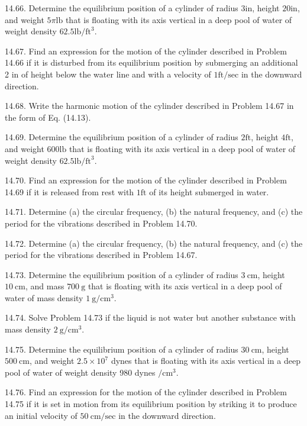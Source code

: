 \documentclass[10pt]{article}
\begin{document}
14.66. Determine the equilibrium position of a cylinder of radius $3 \mathrm{in}$, height $20 \mathrm{in}$, and weight $5 \pi \mathrm{lb}$ that is floating with its axis vertical in a deep pool of water of weight density $62.5 \mathrm{lb} / \mathrm{ft}^{3}$.

14.67. Find an expression for the motion of the cylinder described in Problem 14.66 if it is disturbed from its equilibrium position by submerging an additional 2 in of height below the water line and with a velocity of $1 \mathrm{ft} / \mathrm{sec}$ in the downward direction.

14.68. Write the harmonic motion of the cylinder described in Problem 14.67 in the form of Eq. (14.13).

14.69. Determine the equilibrium position of a cylinder of radius $2 \mathrm{ft}$, height $4 \mathrm{ft}$, and weight $600 \mathrm{lb}$ that is floating with its axis vertical in a deep pool of water of weight density $62.5 \mathrm{lb} / \mathrm{ft}^{3}$.

14.70. Find an expression for the motion of the cylinder described in Problem 14.69 if it is released from rest with $1 \mathrm{ft}$ of its height submerged in water.

14.71. Determine (a) the circular frequency, (b) the natural frequency, and (c) the period for the vibrations described in Problem 14.70.

14.72. Determine (a) the circular frequency, (b) the natural frequency, and (c) the period for the vibrations described in Problem 14.67.

14.73. Determine the equilibrium position of a cylinder of radius $3 \mathrm{~cm}$, height $10 \mathrm{~cm}$, and mass $700 \mathrm{~g}$ that is floating with its axis vertical in a deep pool of water of mass density $1 \mathrm{~g} / \mathrm{cm}^{3}$.

14.74. Solve Problem 14.73 if the liquid is not water but another substance with mass density $2 \mathrm{~g} / \mathrm{cm}^{3}$.

14.75. Determine the equilibrium position of a cylinder of radius $30 \mathrm{~cm}$, height $500 \mathrm{~cm}$, and weight $2.5 \times 10^{7}$ dynes that is floating with its axis vertical in a deep pool of water of weight density 980 dynes $/ \mathrm{cm}^{3}$.

14.76. Find an expression for the motion of the cylinder described in Problem 14.75 if it is set in motion from its equilibrium position by striking it to produce an initial velocity of $50 \mathrm{~cm} / \mathrm{sec}$ in the downward direction.
\end{document}
